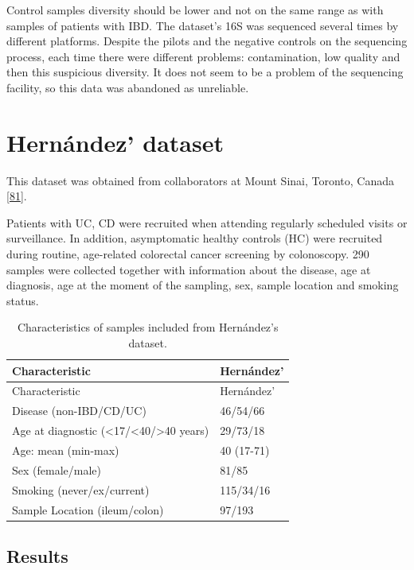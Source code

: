 \documentclass[
  12pt,
  a4paper,
  twoside,
  openright]{book}
\begin{document}
Control samples diversity should be lower and not on the same range as with samples of patients with IBD.
The dataset's 16S was sequenced several times by different platforms.
Despite the pilots and the negative controls on the sequencing process, each time there were different problems: contamination, low quality and then this suspicious diversity.
It does not seem to be a problem of the sequencing facility, so this data was abandoned as unreliable.

\hypertarget{hernandez}{%
\section{Hernández' dataset}\label{hernandez}}

This dataset was obtained from collaborators at Mount Sinai, Toronto, Canada {[}\protect\hyperlink{ref-hernuxe1ndez-rocha2021}{81}{]}.

Patients with UC, CD were recruited when attending regularly scheduled visits or surveillance.
In addition, asymptomatic healthy controls (HC) were recruited during routine, age-related colorectal cancer screening by colonoscopy.
290 samples were collected together with information about the disease, age at diagnosis, age at the moment of the sampling, sex, sample location and smoking status.

\begin{longtable}[]{@{}ll@{}}
\caption{\label{tab:hernandez} Characteristics of samples included from Hernández's dataset.}\tabularnewline
\toprule
Characteristic & Hernández' \\
\midrule
\endfirsthead
\toprule
Characteristic & Hernández' \\
\midrule
\endhead
Disease (non-IBD/CD/UC) & 46/54/66 \\
Age at diagnostic (\textless17/\textless40/\textgreater40 years) & 29/73/18 \\
Age: mean (min-max) & 40 (17-71) \\
Sex (female/male) & 81/85 \\
Smoking (never/ex/current) & 115/34/16 \\
Sample Location (ileum/colon) & 97/193 \\
\bottomrule
\end{longtable}

\hypertarget{results-hernandez}{%
\subsection{Results}\label{results-hernandez}}
\end{document}
